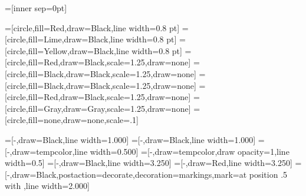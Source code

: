 

\usepackage[svgnames]{xcolor}
\usepackage{tikz}
\usetikzlibrary{decorations.markings}
\usetikzlibrary{shapes.geometric}

\newcommand\scaledLW{0.5} %

\newcommand\scaledNodeSize{0.5} %

\newcommand\nodescale{1.25} %


=[inner sep=0pt]




=[circle,fill=Red,draw=Black,line width=0.8 pt]
=[circle,fill=Lime,draw=Black,line width=0.8 pt]
=[circle,fill=Yellow,draw=Black,line width=0.8 pt]
=[circle,fill=Red,draw=Black,scale=\nodescale,draw=none]
=[circle,fill=Black,draw=Black,scale=\nodescale,draw=none]
=[circle,fill=Black,draw=Black,scale=\nodescale,draw=none]
=[circle,fill=Red,draw=Black,scale=\nodescale,draw=none]
=[circle,fill=Gray,draw=Gray,scale=\nodescale,draw=none]
=[circle,fill=none,draw=none,scale=.1]




=[-,draw=Black,line width=1.000]
=[-,draw=Black,line width=1.000]
=[-,draw=tempcolor,line width=0.500]
=[-,draw=tempcolor,draw opacity=1,line width=0.5]
=[-,draw=Black,line width=3.250]
=[-,draw=Red,line width=3.250]
=[-,draw=Black,postaction={decorate},decoration={markings,mark=at position .5 with {\arrow{>}}},line width=2.000]


